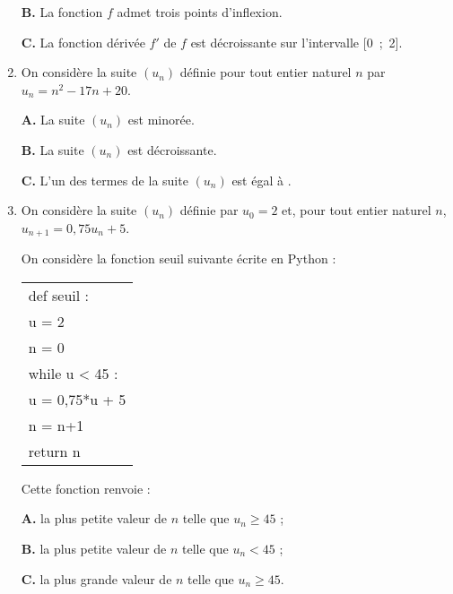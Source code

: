 \begin{enumerate}
\textbf{B.}  La fonction $f$ admet trois points d'inflexion.

\textbf{C.} La fonction dérivée $f'$ de $f$ est décroissante sur l'intervalle [0~;~2].


\item  

On considère la suite $\left(u_n\right)$ définie pour tout entier naturel $n$ par $u_n = n^2 - 17n + 20$. 

\textbf{A.} La suite $\left(u_n\right)$ est minorée.

\textbf{B.} La suite $\left(u_n\right)$ est décroissante.

\textbf{C.} L'un des termes de la suite $\left(u_n\right)$ est égal à .
\item On considère la suite $\left(u_n\right)$ définie par $u_0 = 2$ et, pour tout entier naturel $n$,\,
 $u_{n+1} = 0,75u_n +5$.\\
\begin{minipage}{9cm}
On considère la fonction \og seuil \fg{} suivante écrite en Python :

\begin{center}
\begin{tabular}{|l|}\hline
def seuil {} :\\
\quad u = 2\\
\quad n = 0\\
\quad while u < 45 :\\
\qquad u = 0,75*u + 5\\
\qquad n = n+1\\
\quad return n\\ \hline
\end{tabular}
\end{center}
\end{minipage}
\begin{minipage}{8cm}
Cette fonction renvoie :

\textbf{A.} la plus petite valeur de $n$ telle que $u_n \geqslant  45$ ;
 
\textbf{B.} la plus petite valeur de $n$ telle que $u_n  < 45$ ;
 
\textbf{C.} la plus grande valeur de $n$ telle que $u_n \geqslant 45$.
\end{minipage}
\end{enumerate}


\bigskip

